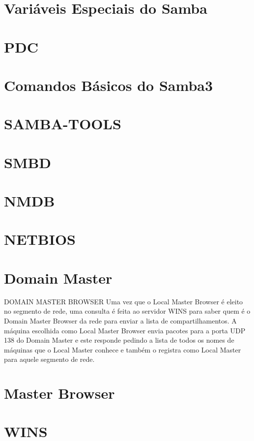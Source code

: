 \section{Variáveis Especiais do Samba}

\section{PDC}

\section{Comandos Básicos do Samba3}

\section{SAMBA-TOOLS}

\section{SMBD}

\section{NMDB}

\section{NETBIOS}

\section{Domain Master}

DOMAIN MASTER BROWSER Uma vez que o Local Master Browser é eleito no segmento de rede, uma consulta é feita ao servidor WINS para saber quem é o Domain Master Browser da rede para enviar a lista de compartilhamentos. A máquina escolhida como Local Master Browser envia pacotes para a porta UDP 138 do Domain Master e este responde pedindo a lista de todos os nomes de máquinas que o Local Master conhece e também o registra como Local Master para aquele segmento de rede.

\section{Master Browser}

\section{WINS}

